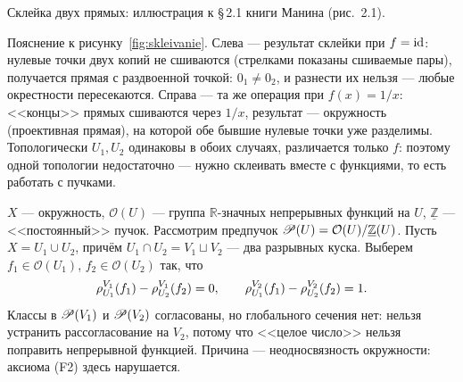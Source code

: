 \begin{risunok}{Склейка двух прямых: иллюстрация к \S\,2.1 книги Манина
 (рис.~2.1).\label{fig:skleivanie}}
\end{risunok}

Пояснение к рисунку~\ref{fig:skleivanie}. Слева --- результат
склейки при $f=\mathrm{id}$: нулевые точки двух копий не сшиваются
(стрелками показаны сшиваемые пары), получается прямая
с раздвоенной точкой: $0_1\neq 0_2$, и разнести их нельзя ---
любые окрестности пересекаются. Справа --- та же операция при
$f(x)=1/x$: <<концы>> прямых сшиваются через $1/x$, результат ---
окружность (проективная прямая), на которой обе бывшие нулевые
точки уже разделимы. Топологически $U_1,U_2$ одинаковы в обоих
случаях, различается только $f$: поэтому одной топологии
недостаточно --- нужно склеивать вместе с функциями, то есть
работать с пучками.

\begin{exm}\label{exm:circle}
$X$ --- окружность, $\mathcal{O}(U)$ --- группа $\mathbb{R}$-значных
непрерывных функций на $U$, $\underline{\mathbb{Z}}$ --- <<постоянный>>
пучок. Рассмотрим предпучок
$\mathscr{P}(U)=\mathcal{O}(U)/\underline{\mathbb{Z}}(U)$.
Пусть $X=U_1\cup U_2$, причём $U_1\cap U_2=V_1\sqcup V_2$ --- два
разрывных куска. Выберем $f_1\in\mathcal{O}(U_1)$, $f_2\in
\mathcal{O}(U_2)$ так, что
\[
 \rho^{V_1}_{U_1}(f_1)-\rho^{V_1}_{U_2}(f_2)=0,
 \qquad
 \rho^{V_2}_{U_1}(f_1)-\rho^{V_2}_{U_2}(f_2)=1.
\]
Классы в $\mathscr{P}(V_1)$ и $\mathscr{P}(V_2)$ согласованы, но глобального
сечения нет: нельзя устранить рассогласование на $V_2$, потому что
<<целое число>> нельзя поправить непрерывной функцией. Причина ---
неодносвязность окружности: аксиома (F2) здесь нарушается.
\end{exm}

